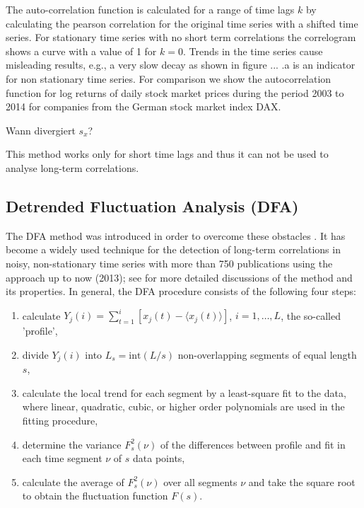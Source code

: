 \documentclass[a4paper,10pt]{scrbook}
\begin{document}
The auto-correlation function is calculated for a range of time lags $k$ by calculating the pearson correlation for the original time series with a shifted time series. For stationary time series with no short term correlations the correlogram shows a curve with a value of 1 for $k=0$. Trends in the time series cause misleading results, e.g., a very slow decay as shown in figure ... .a is an indicator for non stationary time series. For comparison we show the autocorrelation function for log returns of daily stock market prices during the period 2003 to 2014 for companies from the German stock market index DAX.

Wann divergiert $s_x$?


\label{ext.fig.AutoCorrelation} 

 

This method works only for short time lags and thus it can not be used to analyse long-term correlations.



\subsection{Detrended Fluctuation Analysis (DFA)}

The DFA method was introduced in order to overcome these obstacles \cite{Peng.1994}.  It has become a widely
used technique for the detection of long-term correlations in noisy, non-stationary time series with more than 
750 publications using the approach up to now (2013); see \cite{Kantelhardt.2001,Kantelhardt.2009,Bashan2008}
for more detailed discussions of the method and its properties. In general, the DFA procedure consists of the 
following four steps:
\begin{enumerate}
\item calculate $Y_{j}(i) = \sum_{t=1}^{i} [x_{j}(t)-\langle x_{j}(t)\rangle]$, $i=1,\ldots ,L$, the so-called 'profile',
\item divide $Y_{j}(i)$ into $L_{s} = \mathrm{int}(L/s)$
  non-overlapping segments of equal length $s$, 
\item calculate the local trend for each segment by a least-square fit to the data, where linear,
  quadratic, cubic, or higher order polynomials \cite{Bunde.2000} are used in the fitting procedure,
\item determine the variance $F_{s}^{2}(\nu)$ of the differences between
  profile and fit in each time segment $\nu$ of $s$ data points,  
\item calculate the average of $F_{s}^{2}(\nu)$ over all segments $\nu$ and 
  take the square root to obtain the fluctuation function $F(s)$. 
\end{enumerate}
\end{document}
